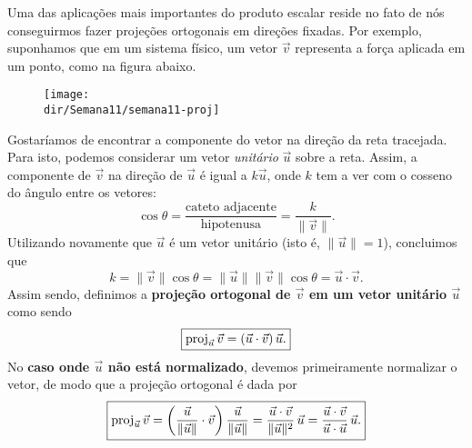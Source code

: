 \documentclass[../livro.tex]{subfiles}  %
\providecommand{\dir}{..}
\begin{document}
Uma das aplicações mais importantes do produto escalar reside no fato de nós conseguirmos fazer projeções ortogonais em direções fixadas. Por exemplo, suponhamos que em um sistema físico, um vetor $\vec{v}$ representa a força aplicada em um ponto, como na figura abaixo.
\begin{figure}[h!]
	\begin{center}
		\texttt{[image: \\dir/Semana11/semana11-proj]}
	\end{center}
\end{figure} Gostaríamos de encontrar a componente do vetor na direção da reta tracejada. Para isto, podemos considerar um vetor \textit{unitário} $\vec{u}$ sobre a reta. Assim, a componente de $\vec{v}$ na direção de $\vec{u}$ é igual a $k \vec{u}$, onde $k$ tem a ver com o cosseno do ângulo entre os vetores:
\begin{equation}
\cos \theta = \frac{\text{cateto adjacente}}{\text{hipotenusa}} = \frac{k}{\|\vec{v}\|}.
\end{equation} Utilizando novamente que $\vec{u}$ é um vetor unitário (isto é, $\|\vec{u}\|=1$), concluimos que
\begin{equation}
k = \|\vec{v}\| \cos \theta = \|\vec{u}\| \|\vec{v}\| \cos \theta = \vec{u} \cdot \vec{v}.
\end{equation} Assim sendo, definimos a \textbf{projeção ortogonal de $\vec{v}$ em um vetor unitário $\vec{u}$} como sendo
\begin{equation}
\boxed{\operatorname{proj}_{\vec{u}} \vec{v} = (\vec{u} \cdot \vec{v}) \, \vec{u}.}
\end{equation} No \textbf{caso onde $\vec{u}$ não está normalizado}, devemos primeiramente normalizar o vetor, de modo que a projeção ortogonal é dada por
\begin{equation}
\boxed{\operatorname{proj}_{\vec{u}} \vec{v} = \bigg( \frac{\vec{u}}{\|\vec{u}\|} \cdot \vec{v} \bigg) \, \frac{\vec{u}}{\|\vec{u}\|} = \frac{\vec{u} \cdot \vec{v}}{\|\vec{u}\|^2} \, \vec{u} = \frac{\vec{u} \cdot \vec{v}}{\vec{u} \cdot \vec{u}} \, \vec{u}.}
\end{equation}
\end{document}
